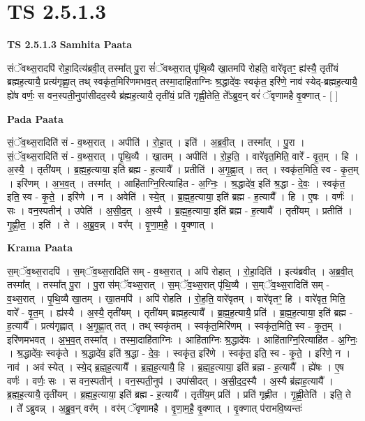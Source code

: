 \documentclass[17pt]{extarticle}
\begin{document}
\section*{ TS 2.5.1.3 }

\textbf{TS 2.5.1.3 } \newline
\textbf{Samhita Paata} \newline

संॅवथ्स॒रादपि॑ रोहा॒दित्य॑ब्रवी॒त् तस्मा᳚त् पु॒रा सं॑ॅवथ्स॒रात् पृ॑थि॒व्यै खा॒तमपि॑ रोहति॒ वारे॑वृतꣳ॒॒ ह्य॑स्यै॒ तृती॑यं ब्रह्मह॒त्यायै॒ प्रत्य॑गृह्णा॒त् तथ् स्वकृ॑त॒मिरि॑णमभव॒त् तस्मा॒दाहि॑ताग्निः श्र॒द्धादे॑वः॒ स्वकृ॑त॒ इरि॑णे॒ नाव॑ स्येद्-ब्रह्मह॒त्यायै॒ ह्ये॑ष वर्णः॒ स वन॒स्पती॒नुपा॑सीदद॒स्यै ब्र॑ह्मह॒त्यायै॒ तृती॑यं॒ प्रति॑ गृह्णी॒तेति॒ ते᳚ऽब्रुव॒न् वरं॑ ॅवृणामहै वृ॒क्णात् - [  ] \newline

\textbf{Pada Paata} \newline

सं॒ॅव॒थ्स॒रादिति॑ सं - व॒थ्स॒रात् । अपीति॑ । रो॒हा॒त् । इति॑ । अ॒ब्र॒वी॒त् । तस्मा᳚त् । पु॒रा । सं॒ॅव॒थ्स॒रादिति॑ सं - व॒थ्स॒रात् । पृ॒थि॒व्यै । खा॒तम् । अपीति॑ ।  रो॒ह॒ति॒ । वारे॑वृत॒मिति॒ वारे᳚ - वृ॒त॒म् । हि ।  अ॒स्यै॒ । तृती॑यम् । ब्र॒ह्म॒ह॒त्याया॒ इति॑ ब्रह्म - ह॒त्यायै᳚ । प्रतीति॑ । अ॒गृ॒ह्णा॒त् । तत् । स्वकृ॑त॒मिति॒ स्व - कृ॒त॒म् । इरि॑णम् । अ॒भ॒व॒त् । तस्मा᳚त् । आहि॑ताग्नि॒रित्याहि॑त - अ॒ग्निः॒ । श्र॒द्धादे॑व॒ इति॑ श्र॒द्धा - दे॒वः॒ । स्वकृ॑त॒ इति॒ स्व - कृ॒ते॒ । इरि॑णे । न । अवेति॑ । स्ये॒त् । ब्र॒ह्म॒ह॒त्याया॒ इति॑ ब्रह्म - ह॒त्यायै᳚ । हि । ए॒षः । वर्णः॑ । सः । वन॒स्पतीन्॑ । उपेति॑ । अ॒सी॒द॒त् । अ॒स्यै । ब्र॒ह्म॒ह॒त्याया॒ इति॑ ब्रह्म - ह॒त्यायै᳚ । तृती॑यम् । प्रतीति॑ । गृ॒ह्णी॒त॒ । इति॑ । ते । अ॒ब्रु॒व॒न्न् । वर᳚म् । वृ॒णा॒म॒है॒ । वृ॒क्णात् ।  \newline


\textbf{Krama Paata} \newline

स॒म्ॅव॒थ्स॒रादपि॑ । स॒म्ॅव॒थ्स॒रादिति॑ सम् - व॒थ्स॒रात् । अपि॑ रोहात् । रो॒हा॒दिति॑ । इत्य॑ब्रवीत् । अ॒ब्र॒वी॒त् तस्मा᳚त् । तस्मा᳚त् पु॒रा । पु॒रा स॑म्ॅवथ्स॒रात् । स॒म्ॅव॒थ्स॒रात् पृ॑थि॒व्यै । स॒म्ॅव॒थ्स॒रादिति॑ सम् - व॒थ्स॒रात् । पृ॒थि॒व्यै खा॒तम् । खा॒तमपि॑ । अपि॑ रोहति । रो॒ह॒ति॒ वारे॑वृतम् । वारे॑वृतꣳ॒॒ हि । वारे॑वृत॒ मिति॒ वारे᳚ - वृ॒त॒म् । ह्य॑स्यै । अ॒स्यै॒ तृती॑यम् । तृती॑यम् ब्रह्मह॒त्यायै᳚ । ब्र॒ह्म॒ह॒त्यायै॒ प्रति॑ । ब्र॒ह्म॒ह॒त्याया॒ इति॑ ब्रह्म - ह॒त्यायै᳚ । प्रत्य॑गृह्णात् । अ॒गृ॒ह्णा॒त् तत् । तथ् स्वकृ॑तम् । स्वकृ॑त॒मिरि॑णम् । स्वकृ॑त॒मिति॒ स्व - कृ॒त॒म् । इरि॑णमभवत् । अ॒भ॒व॒त् तस्मा᳚त् । तस्मा॒दाहि॑ताग्निः । आहि॑ताग्निः श्र॒द्धादे॑वः । आहि॑ताग्नि॒रित्याहि॑त - अ॒ग्निः॒ । श्र॒द्धादे॑वः॒ स्वकृ॑ते । श्र॒द्धादे॑व॒ इति॑ श्र॒द्धा - दे॒वः॒ । स्वकृ॑त॒ इरि॑णे । स्वकृ॑त॒ इति॒ स्व - कृ॒ते॒ । इरि॑णे॒ न । नाव॑ । अव॑ स्येत् । स्ये॒द् ब्र॒ह्म॒ह॒त्यायै᳚ । ब्र॒ह्म॒ह॒त्यायै॒ हि । ब्र॒ह्म॒ह॒त्याया॒ इति॑ ब्रह्म - ह॒त्यायै᳚ । ह्ये॑षः । ए॒ष वर्णः॑ । वर्णः॒ सः । स वन॒स्पतीन्॑ । वन॒स्पती॒नुप॑ । उपा॑सीदत् । अ॒सी॒द॒द॒स्यै । अ॒स्यै ब्र॑ह्मह॒त्यायै᳚ । ब्र॒ह्म॒ह॒त्यायै॒ तृती॑यम् । ब्र॒ह्म॒ह॒त्याया॒ इति॑ ब्रह्म - ह॒त्यायै᳚ । तृती॑य॒म् प्रति॑ । प्रति॑ गृह्णीत । गृ॒ह्णी॒तेति॑ । इति॒ ते । ते᳚ ऽब्रुवन्न् । अ॒ब्रु॒व॒न् वर᳚म् । वर॑म् ॅवृणामहै । वृ॒णा॒म॒है॒ वृ॒क्णात् । वृ॒क्णात् प॑राभवि॒ष्यन्तः॑ \newline
\end{document}
